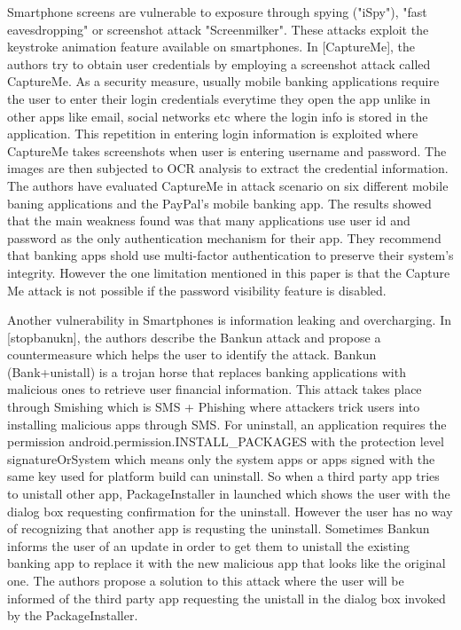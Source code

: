 \documentclass{mproj}
\begin{document}
Smartphone screens are vulnerable to exposure  through spying ("iSpy"), "fast eavesdropping" or screenshot attack "Screenmilker". These attacks exploit the keystroke animation feature available on smartphones. In [CaptureMe], the authors try to obtain user credentials by employing a screenshot attack called CaptureMe. As a security measure, usually mobile banking applications require the user to enter their login credentials everytime they open the app unlike in other apps like email, social networks etc where the login info is stored in the application. This repetition in entering login information is exploited where CaptureMe takes screenshots when user is entering username and password. The images are then subjected to OCR analysis to extract the credential information. The authors have evaluated CaptureMe in attack scenario on six different mobile baning applications and the PayPal's mobile banking app. The results showed that the main weakness found was that many applications use user id and password as the only authentication mechanism for their app. They recommend that banking apps shold use multi-factor authentication to preserve their system's integrity. However the one limitation mentioned in this paper is that the Capture Me attack is not possible if the password visibility feature is disabled.

Another vulnerability in Smartphones is information leaking and overcharging. In [stopbanukn], the authors describe the Bankun attack and propose a countermeasure which helps the user to identify the attack. Bankun (Bank+unistall) is a trojan horse that replaces banking applications with malicious ones to retrieve user financial information. This attack takes place through Smishing which is SMS + Phishing where attackers trick users into installing malicious apps through SMS. For uninstall,  an application requires the permission android.permission.INSTALL\_PACKAGES with the protection level signatureOrSystem which means only the system apps or apps signed with the same key used for platform build can uninstall. So when a third party app tries to unistall other app, PackageInstaller in launched which shows the user with the dialog box requesting confirmation for the uninstall. However the user has no way of recognizing that another app is requsting the uninstall. Sometimes Bankun informs the user of an update in order to get them to unistall the existing banking app to replace it with the new malicious app that looks like the original one. The authors propose a solution to this attack where the user will be informed of the third party app requesting the unistall in the dialog box invoked by the PackageInstaller.
\end{document}

